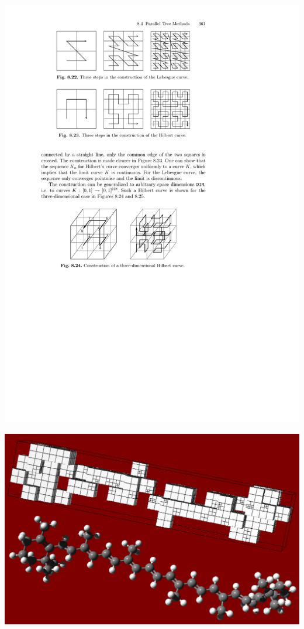 \documentclass[mathserif, 10pt]{beamer}
\begin{document}
\begin{frame}
\begin{minipage}[b]{0.40\linewidth}
	\includegraphics[viewport = 105 325 375 435, scale=0.6, clip]{figures/hilbertCurve.pdf}
    \end{minipage}
    \hfill
    \begin{minipage}[b]{0.4\linewidth}
	\includegraphics[angle=90, scale=0.2]{figures/caroteneGrid.pdf}
    \end{minipage}
\end{frame}
\end{document}
